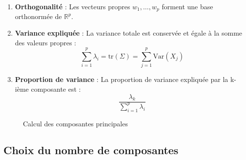 \documentclass[a4paper,12pt]{report}
\begin{document}
\begin{enumerate}
    \item \textbf{Orthogonalité} : Les vecteurs propres $w_1, \ldots, w_p$ forment une base orthonormée de $\mathbb{R}^p$.
    
    \item \textbf{Variance expliquée} : La variance totale est conservée et égale à la somme des valeurs propres :
    \[\sum_{i=1}^p \lambda_i = \text{tr}(\Sigma) = \sum_{j=1}^p \text{Var}(X_j)\]
    
    \item \textbf{Proportion de variance} : La proportion de variance expliquée par la k-ième composante est :
    \[\frac{\lambda_k}{\sum_{i=1}^p \lambda_i}\]
\end{enumerate}
\begin{figure}[H]
\caption{Calcul des composantes principales}
\label{alg:pca}
\end{figure}

\subsection{Choix du nombre de composantes}
\end{document}
